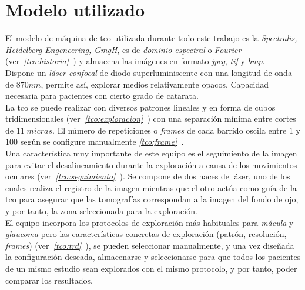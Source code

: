 \section{Modelo utilizado}
El modelo de máquina de \gls{tco} utilizada durante todo este trabajo
es la \emph{Spectralis, Heidelberg Engeneering, GmgH}, es de
\emph{dominio espectral} o \emph{Fourier}
(ver\emph{~\ref{tco:historia}~}) y almacena las
imágenes en formato \emph{jpeg},
\emph{tif} y \emph{bmp}.\\
Dispone un \emph{láser confocal} de diodo superluminiscente con una
longitud de onda de $870nm$, permite así, explorar medios
relativamente opacos. Capacidad necesaria para pacientes con cierto
grado de catarata.\\
La \gls{tco} se puede realizar con diversos patrones lineales y en
forma de cubos tridimensionales
(ver\emph{~\ref{tco:exploracion}~}) con una
separación mínima entre cortes de $11\;micras$. El número de
repeticiones o \emph{frames} de cada barrido oscila entre $1$ y $100$
según se configure manualmente
\emph{\ref{tco:frame}~}.\\
Una característica muy importante de este equipo es el seguimiento de
la imagen para evitar el desalineamiento durante la exploración a
causa de los movimientos oculares
(ver~\emph{\ref{tco:seguimiento}~}). Se
compone de dos haces de láser, uno de los cuales realiza el registro
de la imagen mientras que el otro actúa como guía de la \gls{tco} para
asegurar que las tomografías correspondan a la imagen del fondo de
ojo, y por
tanto, la zona seleccionada para la exploración.\\
El equipo incorpora los protocolos de exploración más habituales para
\emph{mácula} y \emph{\gls{glaucoma}} pero las características
concretas de exploración (patrón, resolución, \emph{frames})
(ver\emph{~\ref{tco:trd}~}), se pueden seleccionar
manualmente, y una vez diseñada la configuración deseada, almacenarse
y seleccionarse para que todos los pacientes de un mismo estudio sean
explorados con el mismo protocolo, y por tanto, poder comparar los
resultados.

